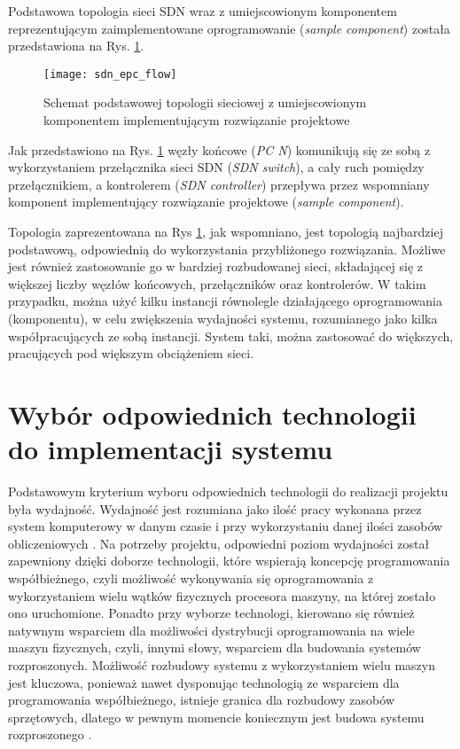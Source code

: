 Podstawowa topologia sieci SDN wraz z umiejscowionym komponentem reprezentującym
zaimplementowane oprogramowanie (\textit{sample component}) została
przedstawiona na Rys. \ref{fig:sdn_epc_flow}. 

\begin{figure}[h]
\centering
\texttt{[image: sdn\_epc\_flow]}
\caption{Schemat podstawowej topologii sieciowej z umiejscowionym komponentem
  implementującym rozwiązanie projektowe}
\label{fig:sdn_epc_flow}
\end{figure}

Jak przedstawiono na Rys. \ref{fig:sdn_epc_flow} węzły końcowe
(\textit{PC N}) komunikują się ze sobą z wykorzystaniem przełącznika sieci SDN
(\textit{SDN switch}), a cały ruch pomiędzy przełącznikiem, a kontrolerem
(\textit{SDN controller}) przepływa przez wspomniany komponent implementujący
rozwiązanie projektowe (\textit{sample component}). 

Topologia zaprezentowana na Rys \ref{fig:sdn_epc_flow}, jak wspomniano, jest
topologią najbardziej podstawową, odpowiednią do wykorzystania przybliżonego
rozwiązania. Możliwe jest również zastosowanie go w bardziej
rozbudowanej sieci, składającej się z większej liczby węzłów końcowych, 
przełączników oraz kontrolerów. W takim przypadku, można użyć kilku instancji
równolegle działającego oprogramowania (komponentu), w celu zwiększenia
wydajności systemu, rozumianego jako kilka współpracujących ze sobą instancji.
System taki, można zastosować do większych, pracujących pod większym obciążeniem
sieci.

\section{Wybór odpowiednich technologii do implementacji systemu}

Podstawowym kryterium wyboru odpowiednich technologii do realizacji projektu
była wydajność. Wydajność jest rozumiana jako ilość pracy wykonana przez system
komputerowy w danym czasie i przy wykorzystaniu danej ilości zasobów
obliczeniowych \cite{distrforfunandprof}. Na potrzeby projektu, odpowiedni
poziom wydajności został zapewniony dzięki doborze technologii, które wspierają
koncepcję programowania współbieżnego, czyli możliwość wykonywania się
oprogramowania z wykorzystaniem wielu wątków fizycznych procesora maszyny, na
której zostało ono uruchomione. Ponadto przy wyborze technologi, kierowano się
również natywnym wsparciem dla możliwości dystrybucji oprogramowania na wiele
maszyn fizycznych, czyli, innymi słowy, wsparciem dla budowania systemów
rozproszonych. Możliwość rozbudowy systemu z wykorzystaniem wielu maszyn jest
kluczowa, ponieważ nawet dysponując technologią ze wsparciem dla programowania
współbieżnego, istnieje granica dla rozbudowy zasobów sprzętowych, dlatego w
pewnym momencie koniecznym jest budowa systemu rozproszonego
\cite{distrforfunandprof}. 

